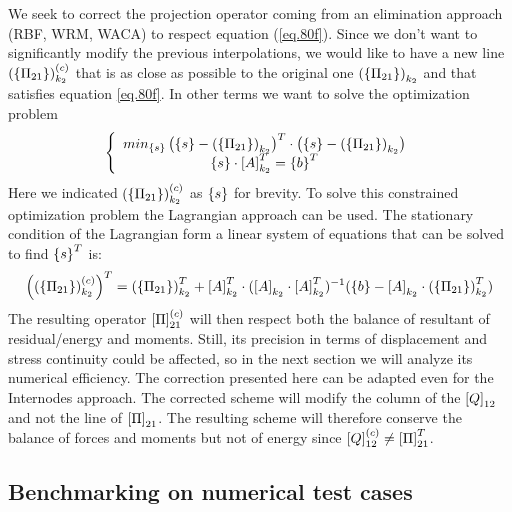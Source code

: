  We seek to correct the projection operator coming from an elimination approach (RBF, WRM, WACA) to respect equation (\ref{eq.80f}). Since we don't want to significantly modify the previous interpolations, we would like to have a new line  $ \left(\left\lbrace{\Pi_{21}}\right \rbrace\right)_{k_2}^{(c)}$ that is as close as possible to the original one  $ \left(\left\lbrace{\Pi_{21}}\right \rbrace\right)_{k_2}$ and that satisfies equation \ref{eq.80f}. In other terms we want to solve the optimization problem
 \begin{equation}
 \label{eq.80g}
\left\lbrace \begin{array}{c}
 min_{\left\lbrace{s}\right \rbrace}\left(\left\lbrace{s}\right \rbrace-\left(\left\lbrace{\Pi_{21}}\right \rbrace\right)_{k_2} \right)^T\cdot\left(\left\lbrace{s}\right \rbrace-\left(\left\lbrace{\Pi_{21}}\right \rbrace\right)_{k_2} \right)\\
 \left\lbrace{s}\right \rbrace\cdot\left[{A}\right]_{k_2}^T=\left\lbrace{b}\right \rbrace^T
 \end{array} \right.
 \end{equation}
 Here we indicated $ \left(\left\lbrace{\Pi_{21}}\right \rbrace\right)_{k_2}^{(c)}$ as $\left\lbrace{s}\right \rbrace$ for brevity. To solve this constrained optimization problem the Lagrangian approach can be used. The stationary condition of the Lagrangian form a linear system of equations that can be solved to find  $\left\lbrace{s}\right \rbrace^T$ is:
 \begin{equation}
 \label{eq.80h}
\left(\left(\left\lbrace{\Pi_{21}}\right \rbrace\right)_{k_2}^{(c)}\right)^T=\left(\left\lbrace{\Pi_{21}}\right \rbrace\right)_{k_2}^T+\left[{A}\right]_{k_2}^T\cdot(\left[{A}\right]_{k_2}\cdot\left[{A}\right]_{k_2}^T)^{-1}(\left\lbrace{b}\right \rbrace-\left[{A}\right]_{k_2}\cdot\left(\left\lbrace{\Pi_{21}}\right \rbrace\right)_{k_2}^T)
 \end{equation}
 The resulting operator $\left[{\Pi}\right]_{21}^{(c)}$ will then respect both the balance of resultant of residual/energy and moments. Still, its precision in terms of displacement and stress continuity could be affected, so in the next section we will analyze its numerical efficiency. The correction presented here can be adapted even for the Internodes approach. The corrected scheme will modify the column of the $\left[{Q}\right]_{12}$ and not the line of $\left[{\Pi}\right]_{21}$. The resulting scheme will therefore conserve the balance  of forces and moments but not of energy since $\left[{Q}\right]_{12}^{(c)}\neq\left[{\Pi}\right]_{21}^T$.
 \subsection{Benchmarking on numerical test cases}\label{sec4}
